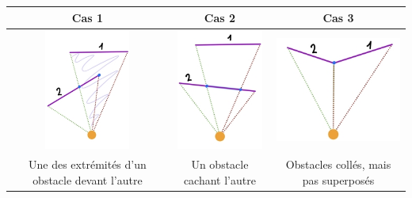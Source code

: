 \documentclass[11pt,french,a4paper,]{article}
\begin{document}
\begin{longtable}[]{@{}ccc@{}}
\toprule
\begin{minipage}[b]{0.30\columnwidth}\centering
Cas 1\strut
\end{minipage} & \begin{minipage}[b]{0.30\columnwidth}\centering
Cas 2\strut
\end{minipage} & \begin{minipage}[b]{0.30\columnwidth}\centering
Cas 3\strut
\end{minipage}\tabularnewline
\midrule
\endhead
\begin{minipage}[t]{0.30\columnwidth}\centering
\includegraphics[width=\textwidth,height=1.5625in]{../img/Graphs/InsideTriangleResize.jpg}\strut
\end{minipage} & \begin{minipage}[t]{0.30\columnwidth}\centering
\includegraphics[width=\textwidth,height=1.5625in]{../img/Graphs/IntersectingResize.jpg}\strut
\end{minipage} & \begin{minipage}[t]{0.30\columnwidth}\centering
\includegraphics[width=\textwidth,height=1.5625in]{../img/Graphs/IsSameResize.jpg}\strut
\end{minipage}\tabularnewline
\begin{minipage}[t]{0.30\columnwidth}\centering
Une des extrémités d'un obstacle devant l'autre\strut
\end{minipage} & \begin{minipage}[t]{0.30\columnwidth}\centering
Un obstacle cachant l'autre\strut
\end{minipage} & \begin{minipage}[t]{0.30\columnwidth}\centering
Obstacles collés, mais pas superposés\strut
\end{minipage}\tabularnewline
\bottomrule
\end{longtable}
\end{document}
